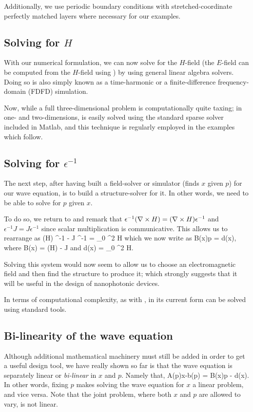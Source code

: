 Additionally,  we use periodic boundary conditions
    with stretched-coordinate %
    perfectly matched layers where necessary for our examples.

\subsection{Solving for $H$}
With our numerical formulation, we can now solve for the $H$-field
    (the $E$-field can be computed from the $H$-field using )
    by using general linear algebra solvers.
Doing so is also simply known as a time-harmonic or 
    a finite-difference frequency-domain (FDFD) simulation.

Now, while a full three-dimensional problem
    is computationally quite taxing;
    in one- and two-dimensions, 
     is easily solved using the standard sparse solver
    included in Matlab,
    and this technique is regularly employed 
    in the examples which follow.


\subsection{Solving for $\epsilon^{-1}$}
The next step,
    after having built a field-solver or simulator
    (finds $x$ given $p$) for our wave equation,
    is to build a structure-solver for it.
In other words, we need to be able to solve for $p$ given $x$.

To do so, we return to 
    and remark that 
    $\epsilon^{-1} (\nabla\times H) = (\nabla\times H) \epsilon^{-1}$ and
    $\epsilon^{-1} J = J \epsilon^{-1}$ 
    since scalar multiplication is communicative.
This allows us to rearrange  as
\BE \curl (\curl H) \epsilon^{-1} - \curl J \epsilon^{-1}  = \mu_0 \omega^2 H  \EE
which we now write as 
\BE B(x)p = d(x), \label{eq:Bd} \EE 
    where
\BE B(x) = \curl (\curl H) - \curl J\EE
    and 
\BE d(x)  = \mu_0 \omega^2 H.  \EE

Solving this system would now seem to allow us
    to choose an electromagnetic field
    and then find the structure to produce it;
    which strongly suggests that it will be useful in
    the design of nanophotonic devices.

In terms of computational complexity, as with , 
     in its current form can be solved using standard tools.

\subsection{Bi-linearity of the wave equation}
Although additional mathematical machinery must still be added
    in order to get a useful design tool,
    we have really shown so far is that the wave equation is 
    separately linear or \emph{bi-linear} in $x$ and $p$.
Namely that,
\BE A(p)x-b(p) = B(x)p - d(x). \label{eq:bilinear} \EE
In other words, fixing $p$ makes solving the wave equation for $x$
    a linear problem, and vice versa.
Note that the joint problem,
    where both $x$ and $p$ are allowed to vary,
    is not linear.

